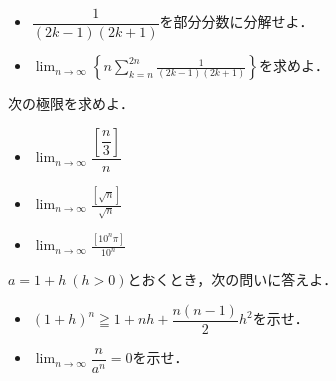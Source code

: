 \documentclass[a4paper,11pt]{ltjsarticle}
\begin{document}
\begin{toi}
\begin{itemize}
    \item [(1)]$\dfrac{1}{(2k-1)(2k+1)}$を部分分数に分解せよ．
    \item [(2)]
    $\displaystyle{\lim_{n\to\infty }\left\{n\sum_{k=n}^{2n}\frac{1}{(2k-1)(2k+1)}\right\}}$を求めよ．
\end{itemize}
\end{toi}
\begin{toi}
次の極限を求めよ．\\[5pt]
\begin{minipage}{0.33\linewidth}
\begin{itemize}
    \item [(1)]$\displaystyle{\lim_{n\to\infty }\dfrac{\left[\dfrac n3\right]}{n}}$
\end{itemize}
\end{minipage}
\begin{minipage}{0.33\linewidth}
    \begin{itemize}
       \item [(2)]$\displaystyle{\lim_{n\to\infty }\frac{[\sqrt n]}{\sqrt n}}$
    \end{itemize}

\end{minipage}
\begin{minipage}{0.33\linewidth}
    \begin{itemize}
       \item [(3)]$\displaystyle{\lim_{n\to\infty }\frac{[10^n\pi]}{10^n}}$
    \end{itemize}
\end{minipage}
\end{toi}

\begin{toi}
$a=1+h~(h>0)$とおくとき，次の問いに答えよ．
\begin{itemize}
    \item [(1)]$(1+h)^n\geqq 1+nh+\dfrac{n(n-1)}{2}h^2$を示せ．
    \item [(2)]$\lim_{n\to\infty }\dfrac{n}{a^n}=0$を示せ．
\end{itemize}
\end{toi}
\end{document}
